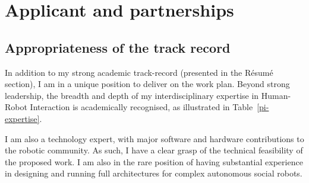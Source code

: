 \section{Applicant and partnerships}

\subsection{Appropriateness of the track record}

In addition to my strong academic track-record (presented in the Résumé
section), I am in a unique position to deliver on the \project work plan. Beyond
strong leadership, the breadth and depth of my interdisciplinary expertise in
Human-Robot Interaction is academically recognised, as illustrated in
Table~\ref{pi-expertise}.

I am also a technology expert, with major software and hardware contributions to
the robotic community. As such, I have a clear grasp of the technical
feasibility of the proposed work. I am also in the rare position of having
substantial experience in designing and running full architectures for complex
autonomous social
robots.

